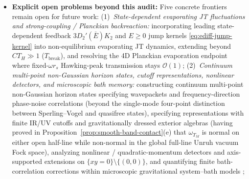 \documentclass[11pt,a4paper]{article}
\theoremstyle{definition}
\theoremstyle{remark}
\newcommand{\cA}{\mathcal{A}}
\newcommand{\cI}{\mathcal{I}}
\newcommand{\1}{\mathbf{1}}
\begin{document}
\begin{itemize}
  (iv)~\emph{Layer-1 vs.\ Layer-2 separation, common-algebra CPL, and no-signaling vs.\ model-compatibility (Remark~\ref{rem:layer2-gauge}, Theorem~\ref{thm:hadamard}(c), Proposition~\ref{prop:layer2-singleshot}):} Continuum fixed-$s$ CPL takes the common-algebra form $\omega_A|_{\cA(W_B)}=\omega_B|_{\cA(W_B)}$ (following directly from exterior Weyl-functional equality for the quasifree extension $T_M$). Under uncorrelated bath preparation, Layer~1 SK reductions leave selective Kraus unravelings non-unique, and reproducing a specified Layer-1 channel ($\sum_x\cI_{B,x}=\Phi_B$) is a model-compatibility constraint strictly stronger than remote no-signaling (which holds for any local trace-preserving non-selective map, including local unitaries). Meanwhile, selective exterior number projections on a single global Hilbert space excite $H_A(\omega)$ above $2\omega n_{\mathrm{BE}}(\omega)>0$ across all outcomes $n\ge 0$ of that instrument and fail to commute with $P_A=|0_A\rangle\langle 0_A|$, cleanly separating remote no-signaling, Layer-1 model compatibility, quantum steering, and observer-separated locality and common-future record-consistency postulates.
  \item \textbf{Explicit open problems beyond this audit:} Five concrete frontiers remain open for future work:
  (1)~\emph{State-dependent evaporating JT fluctuations and strong-coupling / Planckian backreaction:} incorporating leading state-dependent feedback $3D_2'(\bar{E})K_2$ and $E\ge 0$ jump kernels \eqref{eq:ediff-jump-kernel} into non-equilibrium evaporating JT dynamics, extending beyond $CT_H\gg 1$ ($T_{\mathrm{break}}$), and resolving the 4D Planckian evaporation endpoint where fixed-$\omega r_s$ Hawking-peak transmission stays $\mathcal{O}(1)$;
  (2)~\emph{Continuum multi-point non-Gaussian horizon states, cutoff representations, nonlinear detectors, and microscopic bath memory:} constructing continuum multi-point non-Gaussian horizon states specifying wavepackets and frequency-direction phase-noise correlations (beyond the single-mode four-point distinction between Sperling--Vogel and quasifree states), specifying representations with finite IR/UV cutoffs and gravitationally dressed exterior algebras (having proved in Proposition~\ref{prop:smooth-band-contact}(e) that $\omega_{T_M}$ is normal on either open half-line while non-normal in the global full-line Unruh vacuum Fock space), analyzing nonlinear / quadratic-momentum detectors \cite{Zambianco2026} and axis-supported extensions on $\{xy=0\}\setminus\{(0,0)\}$, and quantifying finite bath-correlation corrections within microscopic gravitational system--bath models \cite{Gaikwad2023,WilsonGerow2024};

\end{itemize}
\end{document}
